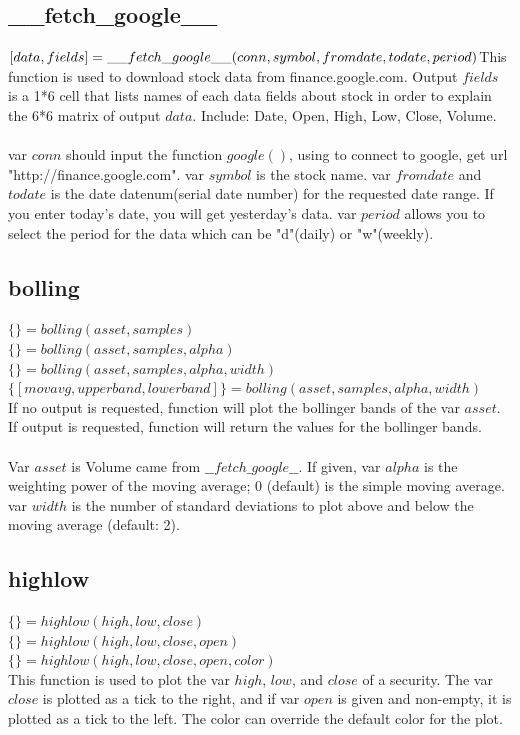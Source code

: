 \documentclass[11pt]{article}
\begin{document}
    \subsection{\_\_fetch\_google\_\_}
$[data,fields]=\_\_fetch\_google\_\_ (conn, symbol, fromdate, todate, period)
\\$This function is used to download stock data from finance.google.com. Output $fields$ is a 1*6 cell that lists names of each data fields about stock in order to explain the 6*6 matrix of output $data$. Include: Date, Open, High, Low, Close, Volume. 
\\
\\var $conn$ should input the function $google()$, using to connect to google, get url "http://finance.google.com". var $symbol$ is the stock name. var $fromdate$ and $ todate$ is the date datenum(serial date number) for the requested date range. If you enter today's date, you will get yesterday's data. var $period$ allows you to select the period for the data which can be "d"(daily) or "w"(weekly).

\subsection{bolling}
$\{\} = bolling (asset, samples)$
\\$\{\} = bolling (asset, samples, alpha)$
\\$\{\} = bolling (asset, samples, alpha, width)$
\\$\{[movavg, upperband, lowerband]\} = bolling (asset, samples, alpha, width)$
\\If no output is requested, function will plot the bollinger bands of the var $asset$. If output is requested, function will return the values for the bollinger bands. 
\\
\\Var $asset$ is Volume came from $\_\_fetch\_google\_\_$. If given, var $alpha$ is the weighting power of the moving average; 0 (default) is the simple moving average.   var $width$ is the number of standard deviations to plot above and below the moving average (default: 2).

\subsection{highlow}
$\{\} = highlow (high, low, close)$
\\$\{\} = highlow (high, low, close, open)$
\\$\{\} = highlow (high, low, close, open, color)$
\\This function is used to plot the var $high$, $low$, and $close$ of a security. The var $close$ is plotted as a tick to the right, and if var $open$ is given and non-empty, it is plotted as a tick to the left.  The color can override the default color for the plot.
\end{document}

